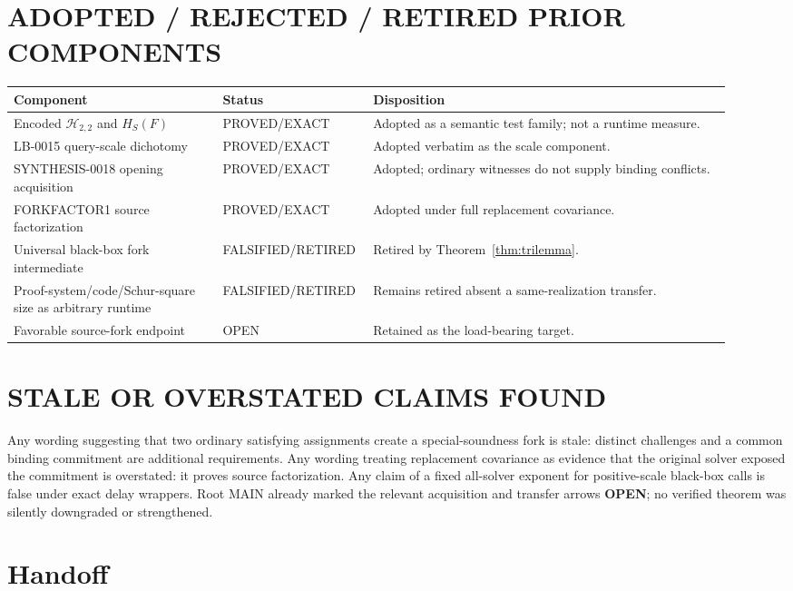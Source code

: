 \documentclass[11pt]{article}
\newcommand{\Hcore}{\mathcal H_{2,2}}
\begin{document}
\section{ADOPTED / REJECTED / RETIRED PRIOR COMPONENTS}

\begin{center}
\begin{tabular}{@{}p{0.28\linewidth}p{0.16\linewidth}p{0.48\linewidth}@{}}
\toprule
Component & Status & Disposition\\
\midrule
Encoded $\Hcore$ and $H_S(F)$ & PROVED/EXACT &
Adopted as a semantic test family; not a runtime measure.\\
LB-0015 query-scale dichotomy & PROVED/EXACT &
Adopted verbatim as the scale component.\\
SYNTHESIS-0018 opening acquisition & PROVED/EXACT &
Adopted; ordinary witnesses do not supply binding conflicts.\\
FORKFACTOR1 source factorization & PROVED/EXACT &
Adopted under full replacement covariance.\\
Universal black-box fork intermediate & FALSIFIED/RETIRED &
Retired by Theorem~\ref{thm:trilemma}.\\
Proof-system/code/Schur-square size as arbitrary runtime & FALSIFIED/RETIRED &
Remains retired absent a same-realization transfer.\\
Favorable source-fork endpoint & OPEN &
Retained as the load-bearing target.\\
\bottomrule
\end{tabular}
\end{center}

\section{STALE OR OVERSTATED CLAIMS FOUND}

Any wording suggesting that two ordinary satisfying assignments create a
special-soundness fork is stale: distinct challenges and a common binding
commitment are additional requirements.  Any wording treating replacement
covariance as evidence that the original solver exposed the commitment is
overstated: it proves source factorization.  Any claim of a fixed all-solver
exponent for positive-scale black-box calls is false under exact delay
wrappers.  Root MAIN already marked the relevant acquisition and transfer
arrows \textbf{OPEN}; no verified theorem was silently downgraded or
strengthened.

\section{Handoff}
\end{document}
